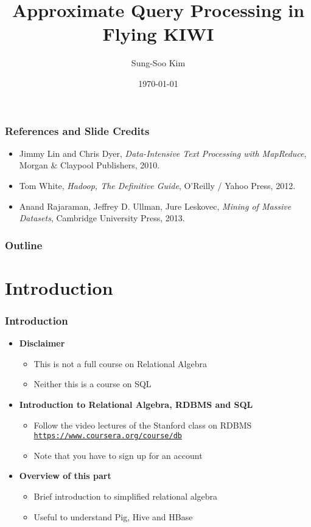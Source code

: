 \documentclass{beamer}
\title[BlinkDB and G-OLA]{Approximate Query Processing in Flying KIWI} %
\author{Sung-Soo Kim} %
\institute[ETRI] %
{
\textit{sungsoo@etri.re.kr} \\ %
\medskip
Data Management Research Section, ETRI %
}
\date{\today} %
\newcommand{\bi}{\begin{itemize}}
\newcommand{\ei}{\end{itemize}}
\newcommand{\ii}{\item}
\begin{document}
\begin{frame}
\titlepage %
\end{frame}

\begin{frame}
\frametitle{References and Slide Credits}
\bi
\ii Jimmy Lin and Chris Dyer, \textit{Data-Intensive Text Processing with MapReduce}, Morgan \& Claypool Publishers, 2010.
\ii Tom White, \textit{Hadoop, The Definitive Guide}, O'Reilly / Yahoo Press, 2012.
\ii Anand Rajaraman, Jeffrey D. Ullman, Jure Leskovec, \textit{Mining of Massive Datasets}, Cambridge University Press, 2013. 
\ei
\end{frame}

\begin{frame}
\frametitle{Outline} %
\tableofcontents 
\end{frame}



\section{Introduction} 

\begin{frame}
\frametitle{Introduction}
\bi
\ii \textbf{Disclaimer}
\bi
\ii This is not a full course on Relational Algebra
\ii Neither this is a course on SQL
\ei
\ii \textbf{Introduction to Relational Algebra, RDBMS and SQL}
\bi
\ii Follow the video lectures of the Stanford class on RDBMS \href{https://www.coursera.org/course/db}{\texttt{https://www.coursera.org/course/db}}
\ii Note that you have to sign up for an account 
\ei
\ii \textbf{Overview of this part}
\bi
\ii Brief introduction to simplified relational algebra
\ii Useful to understand Pig, Hive and HBase
\ei
\ei
\end{frame}
\end{document}
